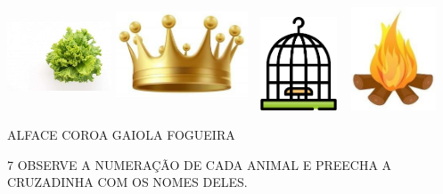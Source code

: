 \includegraphics[width=1.22307in,height=1.24422in]{media/image86.jpg}
\includegraphics[width=1.53669in,height=1.29710in]{media/image87.jpg}
\includegraphics[width=1.09375in,height=1.09375in]{media/image88.png}
\includegraphics[width=1.03854in,height=1.20356in]{media/image89.jpg}

\begin{mdframed}[linewidth=2pt,linecolor=salmao,roundcorner=2pt]
ALFACE \hfill COROA \hfill GAIOLA \hfill FOGUEIRA
\end{mdframed}


\pagebreak
\num{7} OBSERVE A NUMERAÇÃO DE CADA ANIMAL E PREECHA A CRUZADINHA COM OS NOMES DELES.


